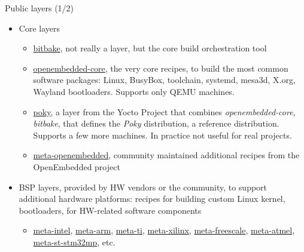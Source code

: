\begin{frame}{Public layers (1/2)}
  \begin{itemize}
  \item Core layers
    \begin{itemize}
    \item \href{https://git.openembedded.org/bitbake/}{bitbake}, not
      really a layer, but the core build orchestration tool
    \item \href{https://git.openembedded.org/openembedded-core}{openembedded-core},
      the very core recipes, to build the most common software
      packages: Linux, BusyBox, toolchain, systemd, mesa3d, X.org, Wayland
      bootloaders. Supports only QEMU machines.
    \item \href{https://git.yoctoproject.org/poky/}{poky}, a layer
      from the Yocto Project that combines {\em openembedded-core},
      {\em bitbake}, that defines the {\em Poky} distribution, a
      reference distribution. Supports a few more machines. In
      practice not useful for real projects.
    \item
      \href{http://cgit.openembedded.org/meta-openembedded/}{meta-openembedded},
      community maintained additional recipes from the OpenEmbedded
      project
    \end{itemize}
  \item BSP layers, provided by HW vendors or the community, to
    support additional hardware platforms: recipes for building custom
    Linux kernel, bootloaders, for HW-related software components
    \begin{itemize}
    \item \href{https://git.yoctoproject.org/meta-intel/}{meta-intel},
      \href{https://git.yoctoproject.org/meta-arm/}{meta-arm},
      \href{https://git.yoctoproject.org/meta-ti/}{meta-ti},
      \href{https://git.yoctoproject.org/meta-xilinx/}{meta-xilinx},
      \href{https://git.yoctoproject.org/meta-freescale/}{meta-freescale},
      \href{https://github.com/linux4sam/meta-atmel}{meta-atmel},
      \href{https://github.com/STMicroelectronics/meta-st-stm32mp}{meta-st-stm32mp},
      etc.
    \end{itemize}
  \end{itemize}
\end{frame}

